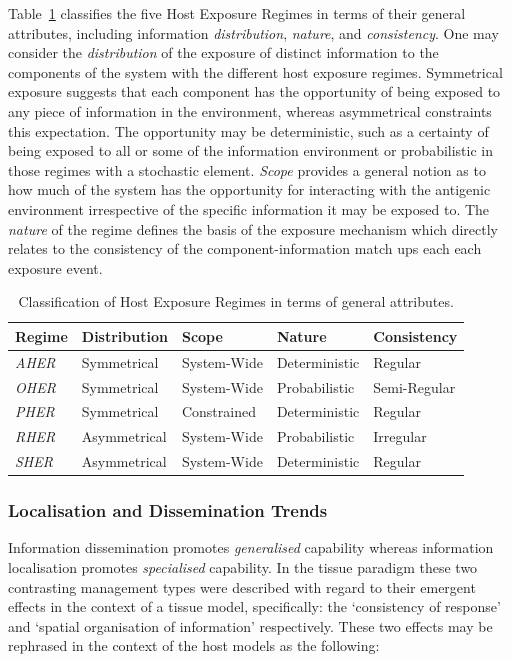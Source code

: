 Table~\ref{tab:hosts:her:attributes} classifies the five Host Exposure Regimes in terms of their general attributes, including information \emph{distribution}, \emph{nature}, and \emph{consistency}. One may consider the \emph{distribution} of the exposure of distinct information to the components of the system with the different host exposure regimes. Symmetrical exposure suggests that each component has the opportunity of being exposed to any piece of information in the environment, whereas asymmetrical constraints this expectation. The opportunity may be deterministic, such as a certainty of being exposed to all or some of the information environment or probabilistic in those regimes with a stochastic element. \emph{Scope} provides a general notion as to how much of the system has the opportunity for interacting with the antigenic environment irrespective of the specific information it may be exposed to. The \emph{nature} of the regime defines the basis of the exposure mechanism which directly relates to the consistency of the component-information match ups each each exposure event.

\begin{table}[ht]
	\centering\small
		\begin{tabular}{lllll}
		\toprule
		\textbf{Regime} & \textbf{Distribution} & \textbf{Scope} & \textbf{Nature} & \textbf{Consistency} \\ 
		\toprule
		\emph{AHER} & Symmetrical & System-Wide & Deterministic & Regular \\ 
		\emph{OHER} & Symmetrical & System-Wide & Probabilistic & Semi-Regular \\ 
		\emph{PHER} & Symmetrical & Constrained & Deterministic & Regular \\ 
		\emph{RHER} & Asymmetrical & System-Wide & Probabilistic & Irregular \\ 
		\emph{SHER} & Asymmetrical & System-Wide & Deterministic & Regular \\ 
		\bottomrule
		\end{tabular}
	\caption{Classification of Host Exposure Regimes in terms of general attributes.}
	\label{tab:hosts:her:attributes}
\end{table}


%
%
\subsubsection{Localisation and Dissemination Trends}
Information dissemination promotes \emph{generalised} capability whereas information localisation promotes \emph{specialised} capability. In the tissue paradigm these two contrasting management types were described with regard to their emergent effects in the context of a tissue model, specifically: the `consistency of response' and `spatial organisation of information' respectively. These two effects may be rephrased in the context of the host models as the following:

